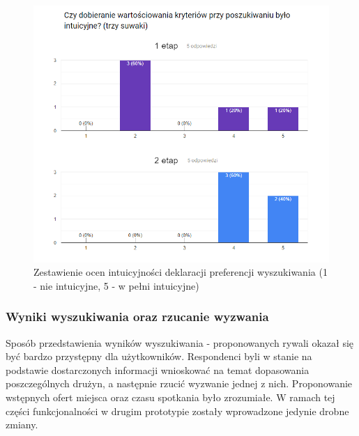 \begin{figure}[H]
\centering
\includegraphics[width=\linewidth]{07-walidacja/rys/survey-search.PNG}
\caption{Zestawienie ocen intuicyjności deklaracji preferencji wyszukiwania (1 - nie intuicyjne, 5 - w pełni intuicyjne)}
\label{fig:survey-suwaki}
\end{figure}

\subsubsection{Wyniki wyszukiwania oraz rzucanie wyzwania}

Sposób przedstawienia wyników wyszukiwania - proponowanych rywali okazał się być bardzo przystępny dla użytkowników. Respondenci byli w stanie na podstawie dostarczonych informacji wnioskować na temat dopasowania poszczególnych drużyn, a następnie rzucić wyzwanie jednej z nich. Proponowanie wstępnych ofert miejsca oraz czasu spotkania było zrozumiałe. W ramach tej części funkcjonalności w drugim prototypie zostały wprowadzone jedynie drobne zmiany. 
